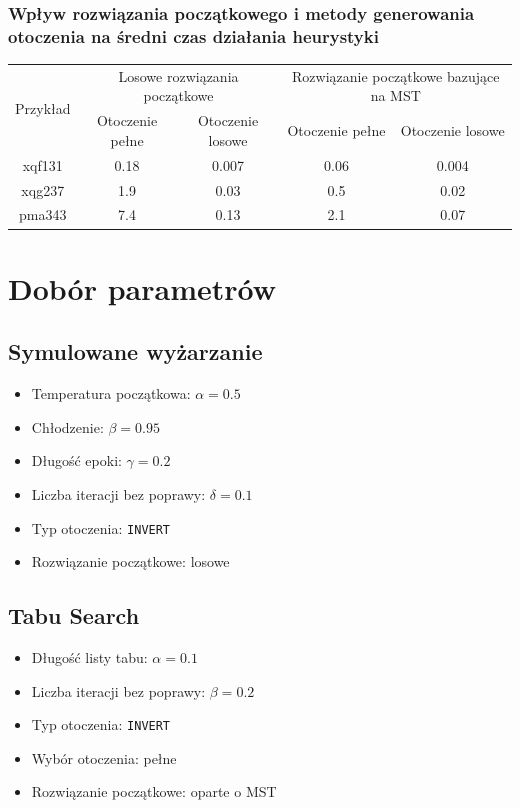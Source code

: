 \documentclass{article}
\begin{document}
\subsubsection{Wpływ rozwiązania początkowego i metody generowania otoczenia na średni czas działania heurystyki}
\begin{table}[h!]
    \centering
    \begin{tabular}{|c|c|c|c|c|}
        \hline 
        \multirow{2}{*}{Przykład} & \multicolumn{2}{|c|}{Losowe rozwiązania początkowe} & \multicolumn{2}{|c|}{Rozwiązanie początkowe bazujące na MST} \\
        \cline{2-5}
        \cline{2-5} & Otoczenie pełne & Otoczenie losowe & Otoczenie pełne & Otoczenie losowe \\
        \hline
        xqf131 & 0.18 & 0.007 & 0.06 & 0.004 \\
        \hline
        xqg237 & 1.9 & 0.03 & 0.5 & 0.02 \\
        \hline
        pma343 & 7.4 & 0.13 & 2.1 & 0.07 \\
        \hline
    \end{tabular}
\end{table}

\section{Dobór parametrów}
\subsection{Symulowane wyżarzanie}
\begin{itemize}
    \item Temperatura początkowa: $\alpha = 0.5$
    \item Chłodzenie: $\beta = 0.95$
    \item Długość epoki: $\gamma = 0.2$
    \item Liczba iteracji bez poprawy: $\delta = 0.1$
    \item Typ otoczenia: \texttt{INVERT}
    \item Rozwiązanie początkowe: losowe
\end{itemize}

\subsection{Tabu Search}
\begin{itemize}
    \item Długość listy tabu: $\alpha = 0.1$
    \item Liczba iteracji bez poprawy: $\beta = 0.2$
    \item Typ otoczenia: \texttt{INVERT}
    \item Wybór otoczenia: pełne
    \item Rozwiązanie początkowe: oparte o MST
\end{itemize}
\end{document}
